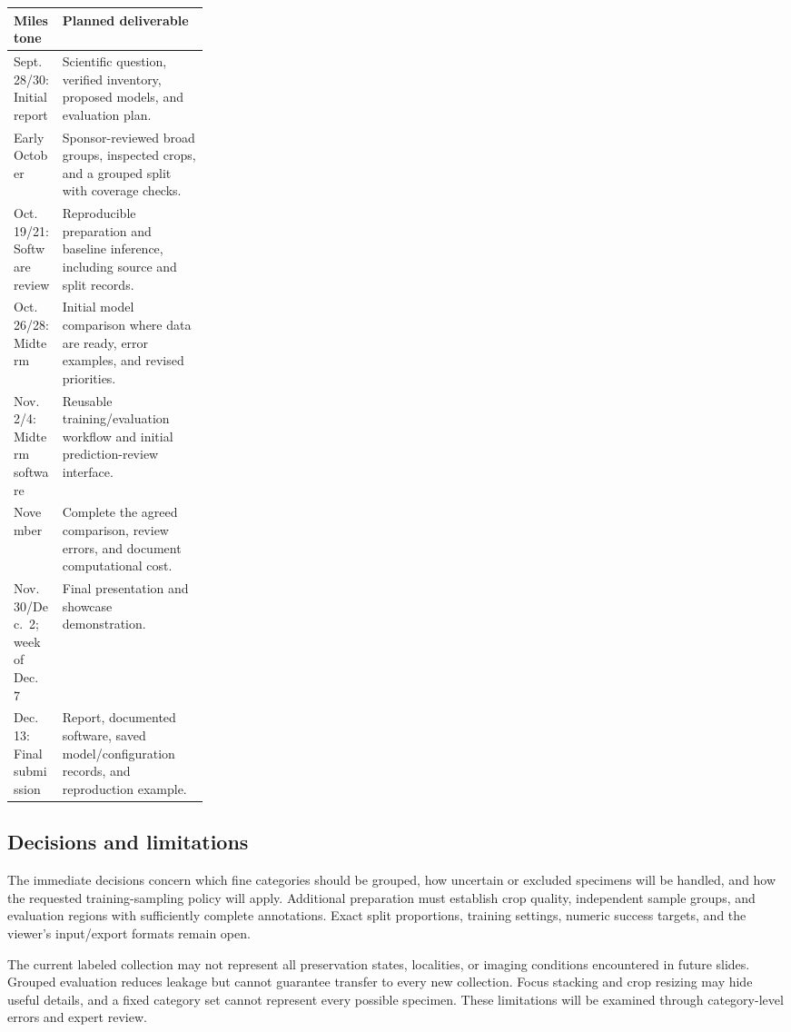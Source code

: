 \documentclass[11pt,letterpaper]{article}
\begin{document}
\begin{center}
\begin{minipage}{\linewidth}
\label{tab:schedule}
\begin{tabularx}{\linewidth}{p{0.25\linewidth}Y}
\toprule
Milestone & Planned deliverable \\
\midrule
Sept.\ 28/30: Initial report & Scientific question, verified inventory, proposed models, and evaluation plan. \\
Early October & Sponsor-reviewed broad groups, inspected crops, and a grouped split with coverage checks. \\
Oct.\ 19/21: Software review & Reproducible preparation and baseline inference, including source and split records. \\
Oct.\ 26/28: Midterm & Initial model comparison where data are ready, error examples, and revised priorities. \\
Nov.\ 2/4: Midterm software & Reusable training/evaluation workflow and initial prediction-review interface. \\
November & Complete the agreed comparison, review errors, and document computational cost. \\
Nov.\ 30/Dec.\ 2; week of Dec.\ 7 & Final presentation and showcase demonstration. \\
Dec.\ 13: Final submission & Report, documented software, saved model/configuration records, and reproduction example. \\
\bottomrule
\end{tabularx}
\end{minipage}
\end{center}

\subsection{Decisions and limitations}
The immediate decisions concern which fine categories should be grouped, how uncertain or excluded specimens will be handled, and how the requested training-sampling policy will apply. Additional preparation must establish crop quality, independent sample groups, and evaluation regions with sufficiently complete annotations. Exact split proportions, training settings, numeric success targets, and the viewer's input/export formats remain open.

The current labeled collection may not represent all preservation states, localities, or imaging conditions encountered in future slides. Grouped evaluation reduces leakage but cannot guarantee transfer to every new collection. Focus stacking and crop resizing may hide useful details, and a fixed category set cannot represent every possible specimen. These limitations will be examined through category-level errors and expert review.
\end{document}
